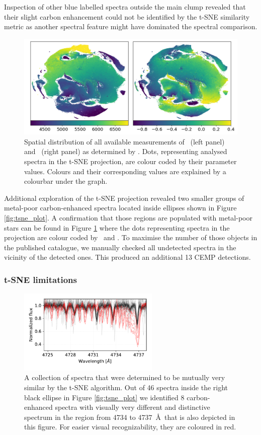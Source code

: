 Inspection of other blue labelled spectra outside the main clump revealed that their slight carbon enhancement could not be identified by the t-SNE similarity metric as another spectral feature might have dominated the spectral comparison.

\begin{figure}
	\centering
	\includegraphics[width=\textwidth]{tsne_params_notitle.png}
	\caption{Spatial distribution of all available measurements of \Teff\ (left panel) and \Feh\ (right panel) as determined by \TC. Dots, representing analysed spectra in the t-SNE projection, are colour coded by their parameter values. Colours and their corresponding values are explained by a colourbar under the graph.}
	\label{fig:tsne_teff_feh}
\end{figure}

Additional exploration of the t-SNE projection revealed two smaller groups of metal-poor carbon-enhanced spectra located inside ellipses shown in Figure \ref{fig:tsne_plot}. A confirmation that those regions are populated with metal-poor stars can be found in Figure \ref{fig:tsne_teff_feh} where the dots representing spectra in the projection are colour coded by \Feh\ and \Teff. To maximise the number of those objects in the published catalogue, we manually checked all undetected spectra in the vicinity of the detected ones. This produced an additional 13 CEMP detections.

\subsubsection{t-SNE limitations}
\begin{figure}
	\centering
	\includegraphics[width=0.6\textwidth]{tsne_cemp.pdf}
	\caption{A collection of spectra that were determined to be mutually very similar by the t-SNE algorithm. Out of 46 spectra inside the right black ellipse in Figure \ref{fig:tsne_plot} we identified 8 carbon-enhanced spectra with visually very different and distinctive spectrum in the region from 4734 to 4737~\AA\ that is also depicted in this figure. For easier visual recognizability, they are coloured in red.}
	\label{fig:tsne_cemps}
\end{figure}

